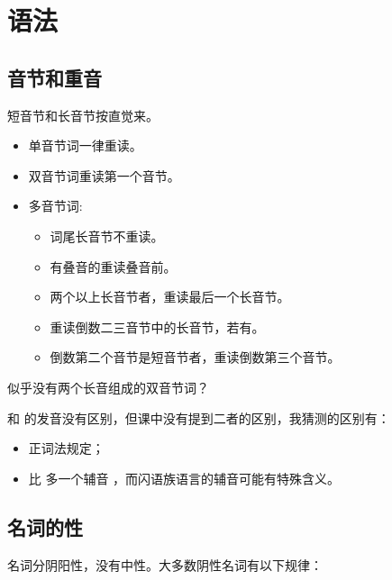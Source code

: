 \section{语法}

\subsection{音节和重音}

短音节和长音节按直觉来。

\begin{itemize}
    \item 单音节词一律重读。
    \item 双音节词重读第一个音节。
    \item 多音节词:
    \begin{itemize}
        \item 词尾长音节不重读。
        \item 有叠音的重读叠音前。
        \item 两个以上长音节者，重读最后一个长音节。
        \item 重读倒数二三音节中的长音节，若有。
        \item 倒数第二个音节是短音节者，重读倒数第三个音节。
    \end{itemize}
\end{itemize}

\begin{note}
    似乎没有两个长音组成的双音节词？
\end{note}

\begin{note}
     和  的发音没有区别，但课中没有提到二者的区别，我猜测的区别有：
    \begin{itemize}
        \item 正词法规定；
        \item {} 比  多一个辅音  ，而闪语族语言的辅音可能有特殊含义。
    \end{itemize}
\end{note}

\subsection{名词的性}

名词分阴阳性，没有中性。大多数阴性名词有以下规律：

